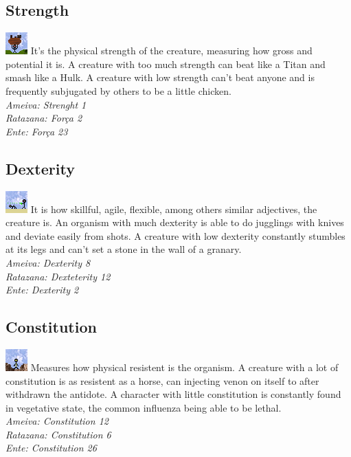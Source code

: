 \documentclass[ letterpaper,12pt]{article}
\begin{document}
\subsection{Strength}
\includegraphics{../data/skills/Img/forca.png}
It's the physical strength of the creature, measuring how gross and potential it is. A creature with too much strength can beat like a Titan and smash like a Hulk. A creature with low strength can't beat anyone and is frequently subjugated by others to be a little chicken.\\
{\it Ameiva: Strenght 1\\
Ratazana: Força 2\\
Ente: Força 23\\}

\subsection{Dexterity}
\includegraphics{../data/skills/Img/destreza.png}
It is how skillful, agile, flexible, among others similar adjectives, the creature is. An organism with much dexterity is able to do jugglings with knives and deviate easily from shots. A creature with low dexterity constantly stumbles at its legs and can't set a stone in the wall of a granary.\\
{\it Ameiva: Dexterity 8\\
Ratazana: Dexteterity 12\\
Ente: Dexterity 2}

\subsection{Constitution}
\includegraphics{../data/skills/Img/constituicao.png}
Measures how physical resistent is the organism. A creature with a lot of constitution is as resistent as a horse, can injecting venon on itself to after withdrawn the antidote. A character with little constitution is constantly found in vegetative state, the common influenza being able to be lethal.\\
{\it Ameiva: Constitution 12\\
Ratazana: Constitution 6\\
Ente: Constitution 26}
\end{document}
